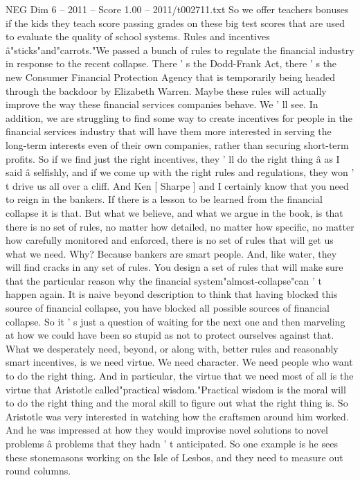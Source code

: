 \begin{textsample}{NEG Dim 6 – 2011 – Score 1.00 – 2011/t002711.txt}
So we offer teachers bonuses if the kids they teach score passing grades on these big test scores that are used to evaluate the quality of school systems.
Rules and incentives â"sticks"and"carrots."We passed a bunch of rules to regulate the financial industry in response to the recent collapse.
There ' s the Dodd-Frank Act, there ' s the new Consumer Financial Protection Agency that is temporarily being headed through the backdoor by Elizabeth Warren.
Maybe these rules will actually improve the way these financial services companies behave.
We ' ll see.
In addition, we are struggling to find some way to create incentives for people in the financial services industry that will have them more interested in serving the long-term interests even of their own companies, rather than securing short-term profits.
So if we find just the right incentives, they ' ll do the right thing â as I said â selfishly, and if we come up with the right rules and regulations, they won ' t drive us all over a cliff.
And Ken [ Sharpe ] and I certainly know that you need to reign in the bankers.
If there is a lesson to be learned from the financial collapse it is that.
But what we believe, and what we argue in the book, is that there is no set of rules, no matter how detailed, no matter how specific, no matter how carefully monitored and enforced, there is no set of rules that will get us what we need.
Why?
Because bankers are smart people.
And, like water, they will find cracks in any set of rules.
You design a set of rules that will make sure that the particular reason why the financial system"almost-collapse"can ' t happen again.
It is naive beyond description to think that having blocked this source of financial collapse, you have blocked all possible sources of financial collapse.
So it ' s just a question of waiting for the next one and then marveling at how we could have been so stupid as not to protect ourselves against that.
What we desperately need, beyond, or along with, better rules and reasonably smart incentives, is we need virtue.
We need character.
We need people who want to do the right thing.
And in particular, the virtue that we need most of all is the virtue that Aristotle called"practical wisdom."Practical wisdom is the moral will to do the right thing and the moral skill to figure out what the right thing is.
So Aristotle was very interested in watching how the craftsmen around him worked.
And he was impressed at how they would improvise novel solutions to novel problems â problems that they hadn ' t anticipated.
So one example is he sees these stonemasons working on the Isle of Lesbos, and they need to measure out round columns.

\end{textsample}
